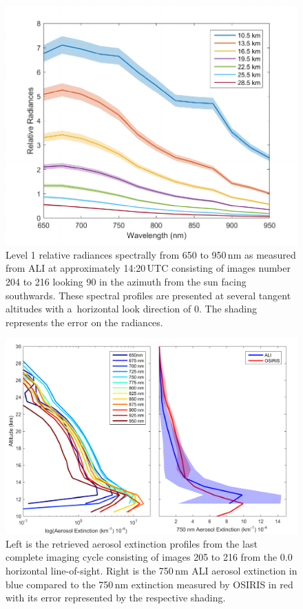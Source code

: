 \documentclass[amtd, online, hvmath]{copernicus}
\begin{document}
\begin{figure}
\includegraphics[width=120mm]{amt-2015-329-discussions-f11.pdf}
\caption{Level 1 relative radiances spectrally from 650 to
  950\,\unit{nm} as measured from ALI at approximately 14:20\,UTC
  consisting of images number 204 to 216 looking 90{\degree} in the
  azimuth from the sun facing southwards. These spectral profiles are
  presented at several tangent altitudes with a~horizontal look
  direction of 0{\degree}. The shading represents the error on the
  radiances.}
\label{amtd-2015-0329-f11.pdf}
\end{figure}

\begin{figure}
\includegraphics[width=120mm]{amt-2015-329-discussions-f12.pdf}
\caption{Left is the retrieved aerosol extinction profiles from the
  last complete imaging cycle consisting of images 205 to 216 from the
  0.0{\degree} horizontal line-of-sight. Right is the 750\,\unit{nm}
  ALI aerosol extinction in blue compared to the 750\,\unit{nm} extinction measured by OSIRIS
  in red with its error represented by the respective
  shading.}
\label{amtd-2015-0329-f12.pdf}
\end{figure}
\end{document}
